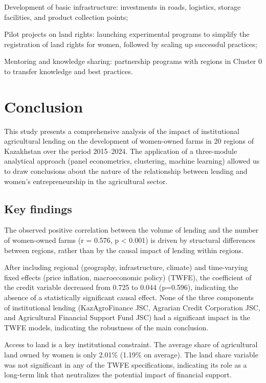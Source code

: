 ﻿\documentclass[sn-mathphys-num]{sn-jnl}
\begin{document}
Development of basic infrastructure: investments in roads, logistics,
storage facilities, and product collection points;

Pilot projects on land rights: launching experimental programs to
simplify the registration of land rights for women, followed by scaling
up successful practices;

Mentoring and knowledge sharing: partnership programs with regions in
Cluster 0 to transfer knowledge and best practices.

\section{Conclusion}

This study presents a comprehensive analysis of the impact of
institutional agricultural lending on the development of women-owned
farms in 20 regions of Kazakhstan over the period 2015--2024. The
application of a three-module analytical approach (panel econometrics,
clustering, machine learning) allowed us to draw conclusions about the
nature of the relationship between lending and women's entrepreneurship
in the agricultural sector.

\subsection{Key findings}

The observed positive correlation between the volume of lending and the
number of women-owned farms (r = 0.576, p \textless{} 0.001) is driven
by structural differences between regions, rather than by the causal
impact of lending within regions.

After including regional (geography, infrastructure, climate) and
time-varying fixed effects (price inflation, macroeconomic policy)
(TWFE), the coefficient of the credit variable decreased from 0.725 to
0.044 (p=0.596), indicating the absence of a statistically significant
causal effect. None of the three components of institutional lending
(KazAgroFinance JSC, Agrarian Credit Corporation JSC, and Agricultural
Financial Support Fund JSC) had a significant impact in the TWFE models,
indicating the robustness of the main conclusion.

Access to land is a key institutional constraint. The average share of
agricultural land owned by women is only 2.01\% (1.19\% on average). The
land share variable was not significant in any of the TWFE
specifications, indicating its role as a long-term link that neutralizes
the potential impact of financial support.
\end{document}
